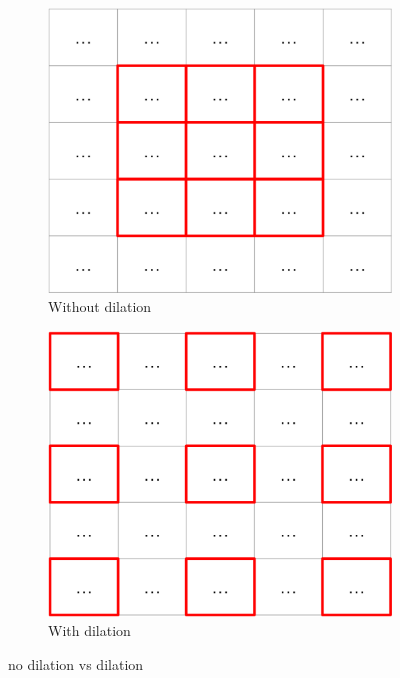 \documentclass[a4paper,12pt]{report}
\theoremstyle{definitionNODot}
\begin{document}
\begin{itemize}
		\begin{figure}[h]
			\begin{subfigure}[b]{0.4\textwidth}
				\centering
				\includegraphics[width=\textwidth]{dilationfilters_withoutdilation.png}
				\caption{Without dilation}
				\label{fig:dilationfilters_withoutdilation}
			\end{subfigure}
			\hfill
			\begin{subfigure}[b]{0.4\textwidth}
				\centering
				\includegraphics[width=\textwidth]{dilationfilters_withdilation.png}
				\caption{With dilation}
				\label{fig:dilationfilters_withdilation}
			\end{subfigure}
			\caption{no dilation vs dilation}
			\label{fig:dilationfilters}
		\end{figure}
		

\end{itemize}
\end{document}
